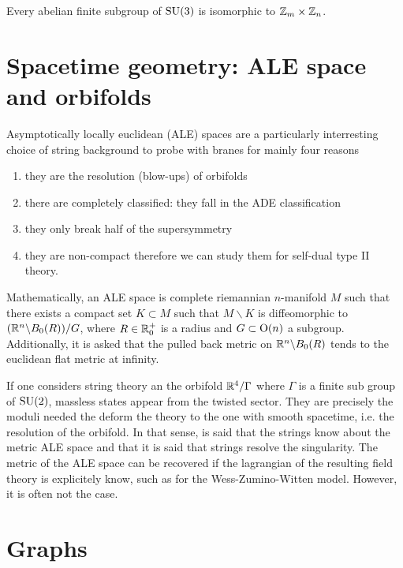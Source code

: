         \begin{theorem*}
            Every abelian finite subgroup of $\text{SU}(3)$ is isomorphic to $\mathbb{Z}_m\times\mathbb{Z}_n$.
        \end{theorem*}

\section{Spacetime geometry: ALE space and orbifolds}\label{app:spacetimegeom}

    Asymptotically locally euclidean (ALE) spaces are a particularly interresting choice of string background to probe with branes for mainly four reasons
    \begin{enumerate}[label=(\roman*)]
        \item they are the resolution (blow-ups) of orbifolds
        \item there are completely classified: they fall in the ADE classification
        \item they only break half of the supersymmetry
        \item they are non-compact therefore we can study them for self-dual type II theory. 
    \end{enumerate}
    Mathematically, an ALE space is complete riemannian $n$-manifold $M$ such that there exists a compact set $K\subset M$ such that $M\backslash K$ is diffeomorphic to $(\mathbb{R}^n\backslash B_0(R))/G$, where $R\in\mathbb{R}^+_0$ is a radius and $G\subset\text{O}(n)$ a subgroup. Additionally, it is asked that the pulled back metric on $\mathbb{R}^n\backslash B_0(R)$ tends to the euclidean flat metric at infinity.

    If one considers string theory an the orbifold $\mathbb{R}^4/\Gamma$ where $\Gamma$ is a finite sub group of $\text{SU}(2)$, massless states appear from the twisted sector. They are precisely the moduli needed the deform the theory to the one with smooth spacetime, i.e. the resolution of the orbifold. In that sense, is said that the strings know about the metric ALE space and that it is said that strings resolve the singularity. The metric of the ALE space can be recovered if the lagrangian of the resulting field theory is explicitely know, such as for the Wess-Zumino-Witten model. However, it is often not the case.

\section{Graphs}

